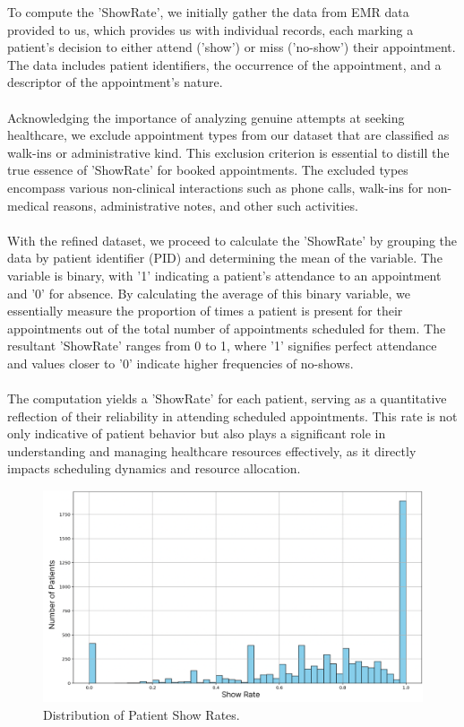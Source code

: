 \documentclass[11pt]{article}
\theoremstyle{definition}
\begin{document}
To compute the 'ShowRate', we initially gather the data from EMR data provided to us, which provides us with individual records, each marking a patient's decision to either attend ('show') or miss ('no-show') their appointment. The data includes patient identifiers, the occurrence of the appointment, and a descriptor of the appointment's nature.\\\\
Acknowledging the importance of analyzing genuine attempts at seeking healthcare, we exclude appointment types from our dataset that are classified as walk-ins or administrative kind. This exclusion criterion is essential to distill the true essence of 'ShowRate' for booked appointments. The excluded types encompass various non-clinical interactions such as phone calls, walk-ins for non-medical reasons, administrative notes, and other such activities.\\\\
With the refined dataset, we proceed to calculate the 'ShowRate' by grouping the data by patient identifier (PID) and determining the mean of the  variable. The  variable is binary, with '1' indicating a patient's attendance to an appointment and '0' for absence. By calculating the average of this binary variable, we essentially measure the proportion of times a patient is present for their appointments out of the total number of appointments scheduled for them. The resultant 'ShowRate' ranges from 0 to 1, where '1' signifies perfect attendance and values closer to '0' indicate higher frequencies of no-shows.\\\\
The computation yields a 'ShowRate' for each patient, serving as a quantitative reflection of their reliability in attending scheduled appointments. This rate is not only indicative of patient behavior but also plays a significant role in understanding and managing healthcare resources effectively, as it directly impacts scheduling dynamics and resource allocation.

\begin{figure}[H]
    \centering
    \includegraphics[width=1\textwidth]{noShow Distribution.png}
    \caption{Distribution of Patient Show Rates.}
    \label{fig:show_rate}
\end{figure}
\end{document}

